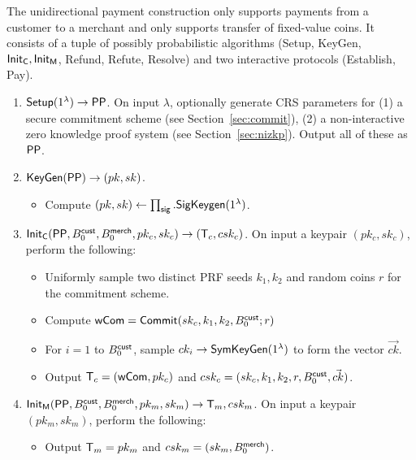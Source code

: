 \documentclass[11pt]{report}
\newcommand{\BC}{B^{\text{\sf cust}}_{\text{0}}}
\newcommand{\BM}{B^{\text{\sf merch}}_{\text{0}}}
\begin{document}
The unidirectional payment construction only supports payments from a customer to a merchant and only supports transfer of fixed-value coins. It consists of a tuple of possibly probabilistic algorithms ({\sf Setup}, {\sf KeyGen}, ${\sf Init}_{\sf C}, {\sf Init}_{\sf M}$, {\sf Refund}, {\sf Refute}, {\sf Resolve}) and two interactive protocols ({\sf Establish}, {\sf Pay}).

\begin{enumerate}

\item ${\sf Setup}(1^\lambda) \rightarrow {\sf PP}$. On input $\lambda$, optionally generate CRS parameters for (1) a secure commitment scheme (see Section~\ref{sec:commit}), (2) a non-interactive zero knowledge proof system (see Section~\ref{sec:nizkp}). Output all of these as ${\sf PP}$.

\item ${\sf KeyGen}({\sf PP}) \rightarrow (pk, sk)$. 
\begin{itemize}
\item Compute $(pk, sk) \leftarrow \prod_{\sf sig}.{\sf SigKeygen}(1^\lambda)$. %
\end{itemize}

\medskip \noindent
\item ${\sf Init_{C}}({\sf PP}, \BC, \BM, pk_c, sk_c) \rightarrow ({\sf T}_c, csk_c)$. On input a keypair $(pk_c, sk_c)$, perform the following:

\begin{itemize} 
\item Uniformly sample two distinct PRF seeds $k_1, k_2$ and random coins $r$ for the commitment scheme. 
\item Compute ${\sf wCom} = {\sf Commit}(sk_c, k_1, k_2, \BC; r)$
\item For $i = 1$ to $\BC$, sample $ck_i \rightarrow {\sf SymKeyGen}(1^\lambda)$ to form the vector $\vec{ck}$. 
\item Output ${\sf T}_c = ({\sf wCom}, pk_c)$ and $csk_c = (sk_c, k_1, k_2, r, \BC, \vec{ck})$.
\end{itemize}

\item ${\sf Init_{M}}({\sf PP}, \BC, \BM, pk_m, sk_m) \rightarrow {\sf T}_m, csk_m$. On input a keypair $(pk_m, sk_m)$, perform the following:

\begin{itemize} 
\item Output ${\sf T}_m = pk_m$ and $csk_m = (sk_m, \BM)$.
\end{itemize}


\end{enumerate}
\end{document}
